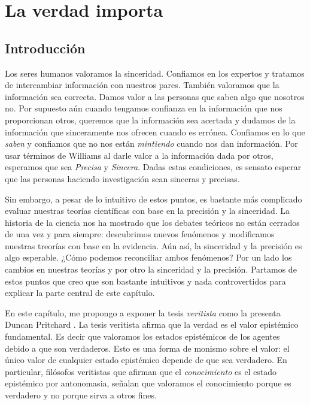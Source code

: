
\chapter{La verdad importa}

\section{Introducción}
 
Los seres humanos valoramos la sinceridad.
Confiamos en los expertos y tratamos de intercambiar información con nuestros pares.
También valoramos que la información sea correcta.
Damos valor a las personas que saben algo que nosotros no.
Por supuesto aún cuando tengamos confianza en la información que nos proporcionan otros, queremos que la información sea acertada y dudamos de la información que sinceramente nos ofrecen cuando es errónea.
Confiamos en lo que \emph{saben} y confiamos que no nos están \emph{mintiendo} cuando nos dan información.
Por usar términos de Williams \parencite{williams2002} al darle valor a la información dada por otros, esperamos que sea \emph{Precisa} y \emph{Sincera}.
Dadas estas condiciones, es sensato esperar que las personas haciendo investigación sean sinceras y precisas.

Sin embargo, a pesar de lo intuitivo de estos puntos, es bastante más complicado evaluar nuestras teorías científicas con base en la precisión y la sinceridad.
La historia de la ciencia nos ha mostrado que los debates teóricos no están cerrados de una vez y para siempre: descubrimos nuevos fenómenos y modificamos nuestras treorías con base en la evidencia.
Aún así, la sinceridad y la precisión es algo esperable.
¿Cómo podemos reconciliar ambos fenómenos?
Por un lado los cambios en nuestras teorías y por otro la sinceridad y la precisión.
Partamos de estos puntos que creo que son bastante intuitivos y nada controvertidos para explicar la parte central de este capítulo.

En este capítulo, me propongo a exponer la tesis \textit{veritista} como la presenta Duncan Pritchard \parencite{pritchardEpistemicValueCognitive2021}.
La tesis veritista afirma que la verdad es el valor epistémico fundamental.
Es decir que valoramos los estados epistémicos de los agentes debido a que son verdaderos.
Esto es una forma de monismo sobre el valor: el único valor de cualquier estado epistémico depende de que sea verdadero.
En particular, filósofos veritistas que afirman que el \emph{conocimiento} es el estado epistémico por antonomasia, señalan que valoramos el conocimiento porque es verdadero y no porque sirva a otros fines.

